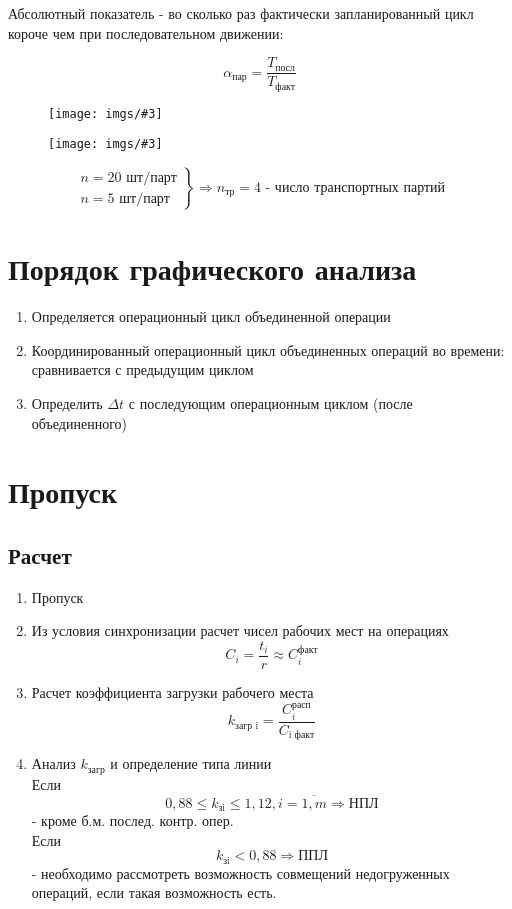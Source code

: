 \documentclass[14pt,a4paper,oneside]{extarticle}
\newcommand{\pic}[3]{
	\begin{figure}[#1]
		\begin{center}
			\texttt{[image: imgs/\#3]}
		\end{center}
	\end{figure}
}
\begin{document}
Абсолютный показатель -  во сколько раз фактически запланированный цикл короче чем при последовательном движении:

\[\alpha_\text{пар}=\frac{T_\text{посл}}{T_\text{факт}}\]

\pic{H}{\textwidth/2}{15}

\pic{H}{\textwidth}{16}

$$
 \left.
    \begin{array}{ll}
        n=20\text{ шт/парт} \\
        n=5\text{ шт/парт}
    \end{array}
\right \}\Longrightarrow n_\text{тр}=4\text{ - число транспортных партий}
$$

\section{Порядок графического анализа}

\begin{enumerate}
    \item Определяется операционный цикл объединенной операции
    \item Координированный операционный цикл объединенных операций во времени: сравнивается с предыдущим циклом 
    \item Определить $\Delta t$ с последующим операционным циклом (после объединенного)
\end{enumerate}

\section{Пропуск}

\subsection{Расчет}

\begin{enumerate}
    \item Пропуск
    \item Из условия синхронизации расчет чисел рабочих мест на операциях \[C_i=\frac{t_i}{r}\approx C_i^{\text{факт}}\]
    \item Расчет коэффициента загрузки рабочего места \[k_\text{загр i}=\frac{C_i^{\text{расп}}}{C_\text{i факт}}\]
    \item Анализ $k_\text{загр}$ и определение типа линии\\Если \[0,88\leq k_\text{зi}\leq1,12, i=\overline{1,m}\Longrightarrow \text{НПЛ}\] - кроме б.м. послед. контр. опер.\\Если \[k_\text{зi}<0,88\Longrightarrow\text{ППЛ}\] - необходимо рассмотреть возможность совмещений недогруженных операций, если такая возможность есть.
\end{enumerate}
\end{document}
